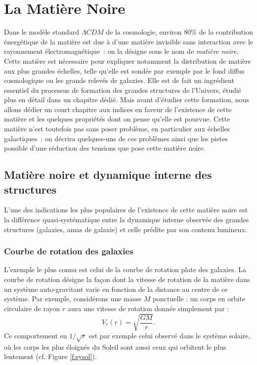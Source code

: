 \chapter{La Matière Noire}

Dans le modèle standard $\Lambda CDM$ de la cosmologie, environ $80\%$ de la contribution énergétique de la matière est due à d'une matière invisible sans interaction avec le rayonnement électromagnétique~: on la désigne sous le nom de \textit{matière noire}. Cette matière est nécessaire pour expliquer notamment la distribution de matière aux plus grandes échelles, telle qu'elle est sondée par exemple par le fond diffus cosmologique ou les grands relevés de galaxies. Elle est de fait un ingrédient essentiel du processus de formation des grandes structures de l'Univers, étudié plus en détail dans un chapitre dédié. Mais avant d'étudier cette formation, nous allons dédier un court chapitre aux indices en faveur de l'existence de cette matière et les quelques propriétés dont on pense qu'elle est pourvue. Cette matière n'est toutefois pas sans poser problème, en particulier aux échelles galactiques~: on décrira quelques-uns de ces problèmes ainsi que les pistes possible d'une réduction des tensions que pose cette matière noire.

\section{Matière noire et dynamique interne des structures}
L'une des indications les plus populaires de l'existence de cette matière noire est la différence quasi-systématique entre la dynamique interne observée des grandes structures (galaxies, amas de galaxie) et celle prédite par son contenu lumineux.

\subsection{Courbe de rotation des galaxies}
L'exemple le plus connu est celui de la courbe de rotation plate des galaxies. La courbe de rotation désigne  la façon dont la vitesse de rotation de la matière dans un système auto-gravitant varie en fonction de la distance au centre de ce système. Par exemple, considérons une masse $M$ ponctuelle : un corps en orbite circulaire de rayon $r$ aura une vitesse de rotation donnée simplement par :
\begin{equation}
V_r(r)=\sqrt{\frac{GM}{r}}.
\end{equation} 
Ce comportement en $1/\sqrt{r}$ est par exemple celui observé dans le système solaire, où les corps les plus éloignés du Soleil sont aussi ceux qui orbitent le plus lentement (cf. Figure \ref{f:sysol}). 

